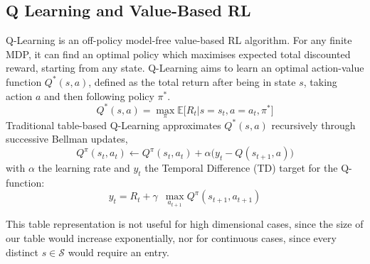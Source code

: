 \documentclass[conference]{IEEEtran}
\begin{document}
\subsection{Q Learning and Value-Based RL}
Q-Learning\cite{watkins} is an off-policy model-free value-based RL algorithm. For any finite MDP, it can find an optimal policy which maximises expected total discounted reward, starting from any state\cite{melo}.
Q-Learning aims to learn an optimal action-value function $Q^*(s,a)$, defined as the total return after being in state $s$, taking action $a$ and then following policy $\pi^*$. %
\begin{equation}
Q^*(s,a) = \max_{\pi} \mathbb{E} \big[ R_t | s=s_t, a=a_t, \pi^* \big]
\label{eq:qlearning}
\end{equation}
Traditional table-based Q-Learning approximates $Q^*(s,a)$ recursively through successive Bellman updates,
\begin{equation}
Q^{\pi}(s_t,a_t) \leftarrow Q^{\pi}(s_t,a_t) + \alpha \big( y_t - Q(s_{t+1},a) \big)
\label{eq:bellmanupdate}
\end{equation}
with $\alpha$ the learning rate and $y_t$ the Temporal Difference (TD) target for the Q-function:
\begin{equation}
y_t = R_t + \gamma \,\,\, \max_{a_{t+1}} Q^{\pi}(s_{t+1},a_{t+1})
\end{equation}

This table representation is not useful for high dimensional cases, since the size of our table would increase exponentially, nor for continuous cases, since every distinct $s\in\mathcal{S}$ would require an entry.

\end{document}
